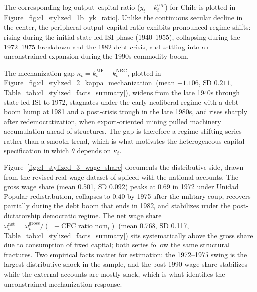 The corresponding log output--capital ratio ($y_t - k_t^{cap}$) for Chile is plotted in Figure~\ref{fig:cl_stylized_1b_yk_ratio}. Unlike the continuous secular decline in the center, the peripheral output--capital ratio exhibits pronounced regime shifts: rising during the initial state-led ISI phase (1940--1955), collapsing during the 1972--1975 breakdown and the 1982 debt crisis, and settling into an unconstrained expansion during the 1990s commodity boom.

The mechanization gap $\kappa_t = k_t^{\text{ME}} - k_t^{\text{NRC}}$, plotted in Figure~\ref{fig:cl_stylized_2_kappa_mechanization} (mean $-1.106$, SD $0.211$, Table~\ref{tab:cl_stylized_facts_summary}), widens from the late 1940s through state-led ISI to 1972, stagnates under the early neoliberal regime with a debt-boom hump at 1981 and a post-crisis trough in the late 1980s, and rises sharply after redemocratization, when export-oriented mining pulled machinery accumulation ahead of structures. The gap is therefore a regime-shifting series rather than a smooth trend, which is what motivates the heterogeneous-capital specification in which $\theta$ depends on $\kappa_t$.

Figure~\ref{fig:cl_stylized_3_wage_share} documents the distributive side,
drawn from the revised real-wage dataset of \citet{Astorga2017, Astorga2023}
spliced with the national accounts. The gross wage share (mean 0.501, SD
0.092) peaks at $0.69$ in 1972 under Unidad Popular redistribution,
collapses to $0.40$ by 1975 after the military coup, recovers partially during the
debt boom that ends in 1982, and stabilizes under the post-dictatorship democratic
regime. The net wage share $\omega_t^{\text{net}} = \omega_t^{\text{gross}} / (1 - \text{CFC\_ratio\_nom}_t)$ (mean 0.768, SD 0.117, Table~\ref{tab:cl_stylized_facts_summary}) sits systematically above the gross share due to consumption of fixed capital; both series follow the same structural fractures. Two empirical facts matter for estimation: the 1972--1975 swing is the largest distributive shock in the sample, and the post-1990 wage-share stabilizes while the external accounts are mostly slack, which is what identifies the unconstrained mechanization response.

